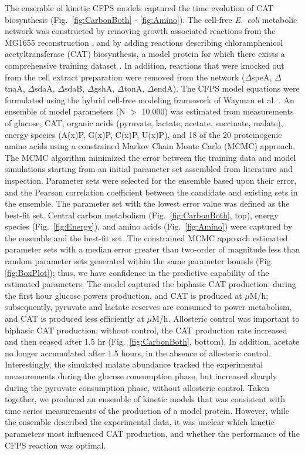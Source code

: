 \documentclass[12pt]{article}
\begin{document}
The ensemble of kinetic CFPS models captured the time evolution of CAT biosynthesis (Fig.~\ref{fig:CarbonBoth} - \ref{fig:Amino}).
The cell-free \textit{E.~coli} metabolic network was constructed by removing growth associated reactions from the MG1655 reconstruction \cite{Feist:2007aa}, and by adding reactions describing chloramphenicol acetyltransferase (CAT) biosynthesis, a model protein for which there exists a comprehensive training dataset \cite{2005_calhoun_BiotechnologyProgress}.
In addition, reactions that were knocked out from the cell extract preparation were removed from the network ($\Delta$speA, $\Delta$tnaA, $\Delta$sdaA, $\Delta$sdaB, $\Delta$gshA, $\Delta$tonA, $\Delta$endA).
The CFPS model equations were formulated using the hybrid cell-free modeling framework of Wayman et al. \cite{pr3010138}.
An ensemble of model parameters (N $>$ 10,000) was estimated from measurements of glucose, CAT, organic acids (pyruvate, lactate, acetate, succinate, malate), energy species (A(x)P, G(x)P, C(x)P, U(x)P), and 18 of the 20 proteinogenic amino acids using a constrained Markov Chain Monte Carlo (MCMC) approach.
The MCMC algorithm minimized the error between the training data and model simulations starting from an initial parameter set assembled from literature and inspection.
Parameter sets were selected for the ensemble based upon their error, and the Pearson correlation coefficient between the candidate and existing sets in the ensemble.
The parameter set with the lowest error value was defined as the best-fit set.
Central carbon metabolism (Fig.~\ref{fig:CarbonBoth}, top), energy species (Fig.~\ref{fig:Energy}), and amino acids (Fig.~\ref{fig:Amino}) were captured by the ensemble and the best-fit set.
The constrained MCMC approach estimated parameter sets with a median error greater than two-order of magnitude less than random parameter sets generated within
the same parameter bounds (Fig. \ref{fig:BoxPlot}); thus, we have confidence in the predictive capability of the estimated parameters.
The model captured the biphasic CAT production: during the first hour glucose powers production, and CAT is produced at  $\mu$M/h; subsequently, pyruvate and lactate reserves are consumed to power metabolism, and CAT is produced less efficiently at  $\mu$M/h.
Allosteric control was important to biphasic CAT production; without control, the CAT production rate increased and then ceased after 1.5 hr (Fig.~\ref{fig:CarbonBoth}, bottom).
In addition, acetate no longer accumulated after 1.5 hours, in the absence of allosteric control.
Interestingly, the simulated malate abundance tracked the experimental measurements during the glucose consumption phase, but increased sharply during the pyruvate consumption phase,
without allosteric control. Taken together, we produced an ensemble of kinetic models that was consistent with time series measurements of the production of a model protein.
However, while the ensemble described the experimental data, it was unclear which kinetic parameters most influenced CAT production, and whether the performance of the CFPS reaction was optimal.
\end{document}
